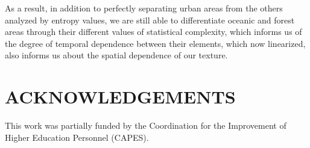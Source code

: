 \documentclass{isprs}
\begin{document}
	As a result, in addition to perfectly separating urban areas from the others analyzed by entropy values, we are still able to differentiate oceanic and forest areas through their different values of statistical complexity, which informs us of the degree of temporal dependence between their elements, which now linearized, also informs us about the spatial dependence of our texture.
	
	
	
	
	\section*{ACKNOWLEDGEMENTS}\label{ACKNOWLEDGEMENTS}
	
	This work was partially funded by the Coordination for the Improvement of Higher Education Personnel (CAPES).
	
	
\end{document}
